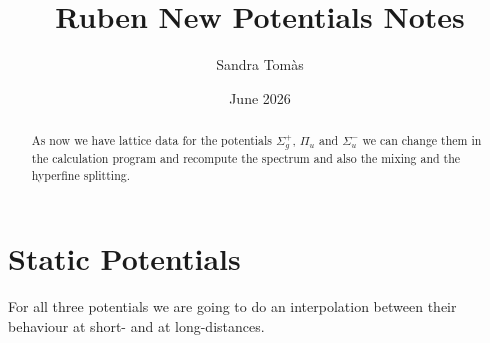 \documentclass[11pt, a4paper]{article}
\title{\textbf{Ruben New Potentials Notes}}
\author{Sandra Tomàs}
\date{June 2026}
\begin{document}
\maketitle

\begin{abstract}
    As now we have lattice data for the potentials $\Sigma_g^+$, $\Pi_u$ and $\Sigma_u^-$ we can change them in the calculation program and recompute the spectrum and also the mixing and the hyperfine splitting.
\end{abstract}


\section{Static Potentials}
For all three potentials we are going to do an interpolation between their behaviour at short- and at long-distances.
\end{document}
